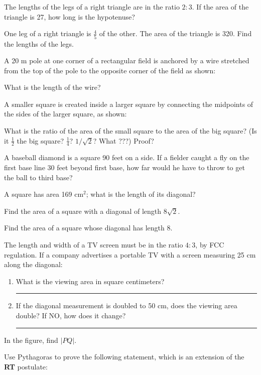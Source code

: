 \documentclass[12pt]{book} %
\begin{document}
\begin{ExerciseList}
\Exercise The lengths of the legs of a right triangle are in the ratio $2:3$. If the area of the triangle is 27, how long is the hypotenuse?

\Exercise One leg of a right triangle is $\frac45$ of the other. The area of the triangle is 320. Find the lengths of the legs.

\Exercise A 20 m pole at one corner of a rectangular field is anchored by a wire stretched from the top of the pole to the opposite corner of the field as shown:


What is the length of the wire?

\Exercise A smaller square is created inside a larger square by connecting the midpoints of the sides of the larger square, as shown:


What is the ratio of the area of the small square to the area of the big square? (Is it $\frac12$ the big square? $\frac14$? $1/\sqrt{2}$? What ???) Proof?

\Exercise A baseball diamond is a square 90 feet on a side. If a fielder caught a fly on the first base line 30 feet beyond first base, how far would he have to throw to get the ball to third base?

\Exercise A square has area 169 cm$^2$; what is the length of its diagonal?

\Exercise Find the area of a square with a diagonal of length $8\sqrt{2}$.

\Exercise Find the area of a square whose diagonal has length 8.

\Exercise The length and width of a TV screen must be in the ratio $4:3$, by FCC regulation. If a company advertises a portable TV with a screen measuring 25 cm along the diagonal:
\begin{enumerate}
\item[(a)] What is the viewing area in square centimeters? \rule{2.5cm}{0.4pt}
\item[(b)] If the diagonal measurement is doubled to 50 cm, does the viewing area double? If NO, how does it change? \rule{3cm}{0.4pt}
\end{enumerate}

\Exercise In the figure, find $|PQ|$.


\Exercise Use Pythagoras to prove the following statement, which is an extension of the \textbf{RT} postulate:


\end{ExerciseList}
\end{document}

